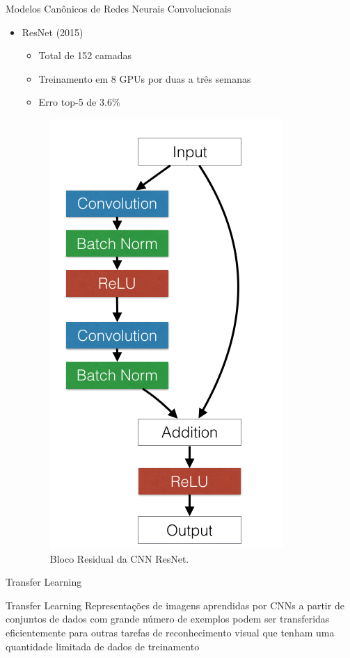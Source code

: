 \begin{frame}{\LARGE{Modelos Canônicos de Redes Neurais Convolucionais}}
   \ \  \\[0.1cm]
   \begin{itemize}
     \item ResNet (2015)
     \begin{itemize}
       \item Total de 152 camadas
       \item Treinamento em 8 GPUs por duas a três semanas
       \item Erro top-5 de $3.6\%$
     \end{itemize}
     \begin{figure}[h!]
     \centering
     \caption{Bloco Residual da CNN ResNet.}\label{fig:bloco_residual}
     \includegraphics[height=0.3\textheight]{img/resnets_modelvariants}
     \end{figure}
   \end{itemize}
\end{frame}

\begin{frame}{Transfer Learning}
   \ \  \\[0.1cm]
     \begin{block}{Transfer Learning}
          Representações de imagens aprendidas por CNNs a partir de conjuntos de dados com grande número de exemplos podem ser transferidas eficientemente para outras tarefas de reconhecimento visual que tenham uma quantidade limitada de dados de treinamento
     \end{block}
\end{frame}

